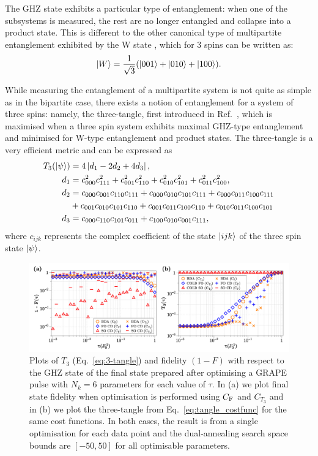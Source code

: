 The GHZ state exhibits a particular type of entanglement: when one of the subsystems is measured, the rest are no longer entangled and collapse into a product state. This is different to the other canonical type of multipartite entanglement exhibited by the W state \cite{cabello_bells_2002}, which for 3 spins can be written as:
\begin{equation}\label{eq:W_state}
    \ket{W} = \frac{1}{\sqrt{3}}(\ket{001} + \ket{010} + \ket{100}).
\end{equation}

While measuring the entanglement of a multipartite system is not quite as simple as in the bipartite case, there exists a notion of entanglement for a system of three spins: namely, the three-tangle, first introduced in Ref.~\cite{coffman_distributed_2000}, which is maximised when a three spin system exhibits maximal GHZ-type entanglement and minimised for W-type entanglement and product states. The three-tangle is a very efficient metric and can be expressed as
\begin{equation}\label{eq:3-tangle}
	\begin{aligned}
		T_3(\ket{\psi}) &= 4 \left| d_1 - 2 d_2 + 4 d_3 \right|, \\
		d_1 &= c^2_{000}c^2_{111} + c^2_{001}c^2_{110} + c^2_{010}c^2_{101} + c^2_{011}c^2_{100}, \\
		d_2 &= c_{000}c_{001}c_{110}c_{111} + c_{000}c_{010}c_{101}c_{111} + c_{000}c_{011}c_{100}c_{111} \\
		 &+ c_{001}c_{010}c_{101}c_{110} + c_{001}c_{011}c_{100}c_{110} + c_{010}c_{011}c_{100}c_{101} \\
		d_3 &= c_{000}c_{110}c_{101}c_{011} + c_{100}c_{010}c_{001}c_{111},
	\end{aligned}
\end{equation}
where $c_{ijk}$ represents the complex coefficient of the state $\ket{ijk}$ of the three spin state $\ket{\psi}$. 

\begin{figure}[t]
    \centering
    \includegraphics[width=\linewidth]{images_v1/tangle_plots.png} \caption[Preparing 3-spin GHZ states using the 3-tangle as a metric.]{Plots of $T_3$ (Eq.~\eqref{eq:3-tangle}) and fidelity $(1 - F)$ with respect to the GHZ state of the final state prepared after optimising a GRAPE pulse with $N_k = 6$ parameters for each value of $\tau$. In (a) we plot final state fidelity when optimisation is performed using $C_{\rm F}$ and $C_{T_3}$ and in (b) we plot the three-tangle from Eq.~\eqref{eq:tangle_costfunc} for the same cost functions. In both cases, the result is from a single optimisation for each data point and the dual-annealing search space bounds are $[-50,50]$ for all optimisable parameters.}\label{fig:tangle_v_fidelity}
\end{figure}

